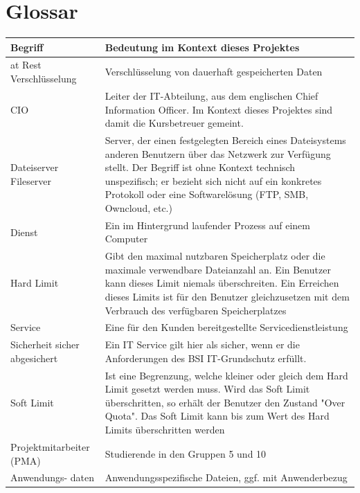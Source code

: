 \section{Glossar}
\begin{center}
\begin{longtable}{p{3.2cm}p{12cm}}
\toprule
Begriff & Bedeutung im Kontext dieses Projektes \\
\midrule
at Rest Verschlüsselung & Verschlüsselung von dauerhaft gespeicherten Daten \\
\midrule
CIO & Leiter der IT-Abteilung, aus dem englischen Chief Information Officer. Im Kontext dieses Projektes sind damit die Kursbetreuer gemeint. \\
\midrule
Dateiserver \newline Fileserver & Server, der einen festgelegten Bereich eines Dateisystems anderen Benutzern über das Netzwerk zur Verfügung stellt. Der Begriff ist ohne Kontext technisch unspezifisch; er bezieht sich nicht auf ein konkretes Protokoll oder eine Softwarelösung (FTP, SMB, Owncloud, etc.) \\
\midrule
Dienst & Ein im Hintergrund laufender Prozess auf einem Computer \\
\midrule
Hard Limit & Gibt den maximal nutzbaren Speicherplatz oder die maximale verwendbare Dateianzahl an. Ein Benutzer kann dieses Limit niemals überschreiten. Ein Erreichen dieses Limits ist für den Benutzer gleichzusetzen mit dem Verbrauch des verfügbaren Speicherplatzes \\
\midrule
Service & Eine für den Kunden bereitgestellte Servicedienstleistung \\
\midrule
Sicherheit \newline sicher \newline abgesichert & Ein IT Service gilt hier als sicher, wenn er die Anforderungen des BSI IT-Grundschutz erfüllt. \\
\midrule
Soft Limit & Ist eine Begrenzung, welche kleiner oder gleich dem Hard Limit gesetzt werden muss. Wird das Soft Limit überschritten, so erhält der Benutzer den Zustand "Over Quota". Das Soft Limit kann bis zum Wert des Hard Limits überschritten werden \\
\midrule
Projektmitarbeiter \newline (PMA) & Studierende in den Gruppen 5 und 10 \\
\midrule
Anwendungs- \newline daten & Anwendungsspezifische Dateien, ggf. mit Anwenderbezug \\

\end{longtable}
\end{center}
